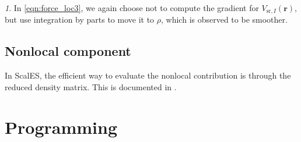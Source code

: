 \documentclass{article}
\newcommand{\bvec}[1]{\mathbf{#1}}
\newcommand{\vr}{\bvec{r}}
\theoremstyle{plain}
\theoremstyle{remark}
\newtheorem{rem}[thm]{\protect\remarkname}
\theoremstyle{plain}
\theoremstyle{plain}
\theoremstyle{plain}
\providecommand{\remarkname}{Remark}
\begin{document}
\begin{rem}
In \cref{eqn:force_loc3}, we again choose not to compute the gradient for $V_{\text{sr},I}(\vr)$, but use integration by parts to move it to $\rho$, which is observed to be smoother. 
\end{rem}

\subsection{Nonlocal component}

In ScalES, the efficient way to evaluate the nonlocal contribution is through the reduced density matrix. This is documented in \cite[Eq. (29)]{ZhangLinHuEtAl2017}.

\section{Programming}



\end{document}
